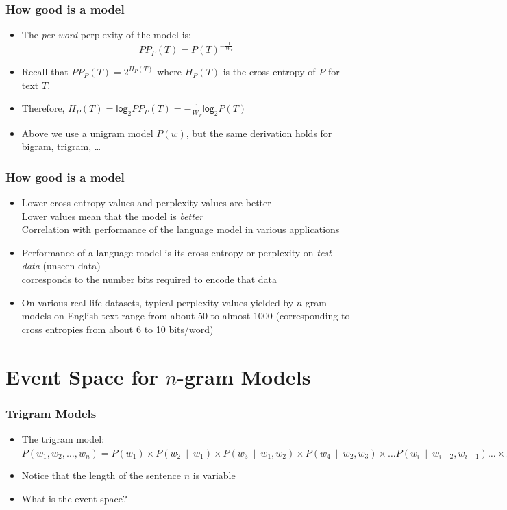 \begin{frame}
\frametitle{How good is a model}
\begin{itemize}[<+->]
\item The {\em per word} perplexity of the model is:
\[ \textit{PP}_P(T) = P(T)^{- \frac{1}{W_T}} \]

\item Recall that $\textit{PP}_P(T) = 2^{H_P(T)}$ where $H_P(T)$ is the cross-entropy of $P$ for text $T$.

\item Therefore, $H_P(T) = \textsf{log}_2 \textit{PP}_P(T) = - \frac{1}{W_T} \textsf{log}_2 P(T)$

\item Above we use a unigram model $P(w)$, but the same derivation holds for bigram, trigram, \dots
\end{itemize}
\end{frame}

\begin{frame}
\frametitle{How good is a model}
\begin{itemize}[<+->]
\item Lower cross entropy values and perplexity values are better \\
Lower values mean that the model is {\em better} \\
Correlation with performance of the language model in various applications
\item Performance of a language model is its cross-entropy or perplexity on {\em test data} (unseen data) \\
corresponds to the number bits required to encode that data
\item On various real life datasets, typical perplexity values yielded by $n$-gram models on English text range from about 50 to almost 1000 (corresponding to cross entropies from about 6 to 10 bits/word)
\end{itemize}
\end{frame}

\section*{Event Space for $n$-gram Models}

\begin{frame}
\frametitle{Trigram Models}
\begin{itemize}[<+->]
\item The trigram model:\\
$P(w_1, w_2, \ldots, w_n) = P(w_1) \times P(w_2~\mid~w_1) \times 
P(w_3~\mid~w_1, w_2) \times P(w_4~\mid~w_2, w_3) 
\times \ldots P(w_i~\mid~w_{i-2}, w_{i-1}) \ldots 
\times P(w_n~\mid~w_{n-2}, \ldots, w_{n-1}) $
\item Notice that the length of the sentence $n$ is variable
\item What is the event space?
\end{itemize}
\end{frame}

